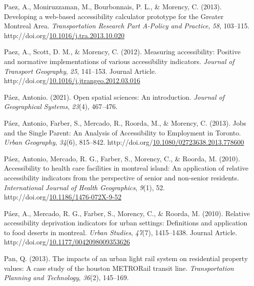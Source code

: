 \documentclass[
11pt, %
oneside, %
english, %
singlespacing, %
]{macthesis} %
\newlength{\cslhangindent}
\newenvironment{CSLReferences}[2] %
{\begin{list}{}{%
	\setlength{\itemindent}{0pt}
	\setlength{\leftmargin}{0pt}
	\setlength{\parsep}{0pt}
	\ifodd #1
	\setlength{\leftmargin}{\cslhangindent}
	\setlength{\itemindent}{-1\cslhangindent}
	\fi
	\setlength{\itemsep}{#2\baselineskip}}}
{\end{list}}
\begin{document}
\begin{CSLReferences}{1}{0}
Paez, A., Moniruzzaman, M., Bourbonnais, P. L., \& Morency, C. (2013). Developing a web-based accessibility calculator prototype for the {Greater} {Montreal} {Area}. \emph{Transportation Research Part A-Policy and Practice}, \emph{58}, 103--115. http://doi.org/\href{https://doi.org/10.1016/j.tra.2013.10.020}{10.1016/j.tra.2013.10.020}

Paez, A., Scott, D. M., \& Morency, C. (2012). Measuring accessibility: Positive and normative implementations of various accessibility indicators. \emph{Journal of Transport Geography}, \emph{25}, 141--153. Journal Article. http://doi.org/\href{https://doi.org/10.1016/j.jtrangeo.2012.03.016}{10.1016/j.jtrangeo.2012.03.016}

Páez, Antonio. (2021). Open spatial sciences: An introduction. \emph{Journal of Geographical Systems}, \emph{23}(4), 467--476.

Páez, Antonio, Farber, S., Mercado, R., Roorda, M., \& Morency, C. (2013). Jobs and the {Single} {Parent}: {An} {Analysis} of {Accessibility} to {Employment} in {Toronto}. \emph{Urban Geography}, \emph{34}(6), 815--842. http://doi.org/\href{https://doi.org/10.1080/02723638.2013.778600}{10.1080/02723638.2013.778600}

Páez, Antonio, Mercado, R. G., Farber, S., Morency, C., \& Roorda, M. (2010). Accessibility to health care facilities in montreal island: An application of relative accessibility indicators from the perspective of senior and non-senior residents. \emph{International Journal of Health Geographics}, \emph{9}(1), 52. http://doi.org/\href{https://doi.org/10.1186/1476-072X-9-52}{10.1186/1476-072X-9-52}

Páez, A., Mercado, R. G., Farber, S., Morency, C., \& Roorda, M. (2010). Relative accessibility deprivation indicators for urban settings: Definitions and application to food deserts in montreal. \emph{Urban Studies}, \emph{47}(7), 1415--1438. Journal Article. http://doi.org/\href{https://doi.org/10.1177/0042098009353626}{10.1177/0042098009353626}

Pan, Q. (2013). The impacts of an urban light rail system on residential property values: A case study of the houston METRORail transit line. \emph{Transportation Planning and Technology}, \emph{36}(2), 145--169.


\end{CSLReferences}
\end{document}

